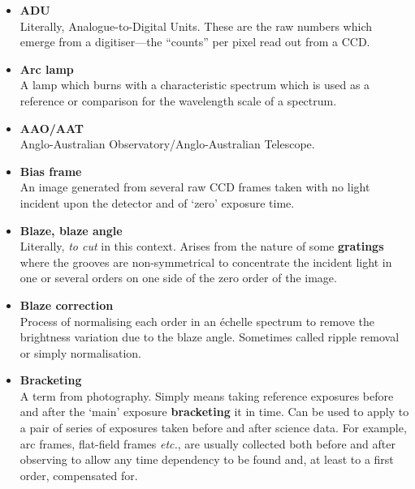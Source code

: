 \documentclass[twoside,11pt]{article}
\newcommand{\htmlref}[2]{#1}
\newcommand{\sgspec}[2]{#1}
\newcommand{\sgspec}[2]{#2}
\begin{document}
\begin{itemize}

\item {\bf\label{gl_adu}ADU}\\
      Literally, Analogue-to-Digital Units.  These are the raw numbers
      which emerge from a digitiser\sgspec{---}{ - }the ``counts'' per pixel
      read out from a CCD.

\item {\bf\label{gl_arc_lamp}Arc lamp}\\
      A lamp which burns with a characteristic spectrum which is used as
      a reference or comparison for the wavelength scale of a spectrum.

\item {\bf\label{gl_aao_aat}AAO/AAT}\\
      Anglo-Australian Observatory/Anglo-Australian Telescope.

\item {\bf\label{gl_bias_frame}Bias frame}\\
      An image generated from several raw CCD frames taken with no
      light incident upon the detector and of `zero' exposure time.

\item {\bf\label{gl_blaze}Blaze, blaze angle}\\
      Literally, {\sl to cut\/} in this context.  Arises from the nature
      of some \htmlref{{\bf gratings}}{gl_grating} where the grooves are
      non-symmetrical to
      concentrate the incident light in one or several orders on one
      side of the zero order of the image.

\item {\bf\label{gl_blaze_correction}Blaze correction}\\
      Process of normalising each order in an \'{e}chelle spectrum
      to remove the brightness variation due to the blaze angle.
      Sometimes called ripple removal or simply normalisation.

\item {\bf\label{gl_bracketing}Bracketing}\\
      A term from photography.  Simply means taking reference exposures
      before and after the `main' exposure {\bf bracketing} it in time.
      Can be used to apply to a pair of series of exposures taken before
      and after science data.  For example, arc frames, flat-field frames
      {\em etc.}, are usually collected both before and after observing to
      allow any time dependency to be found and, at least to a first order,
      compensated for.


\end{itemize}
\end{document}
